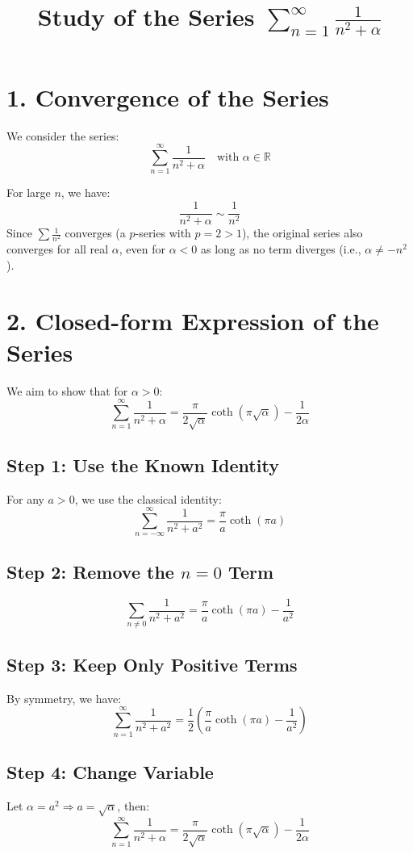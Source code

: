 \documentclass[a4paper,11pt]{article}
\title{Study of the Series \(\displaystyle \sum_{n=1}^{\infty} \frac{1}{n^2 + \alpha}\)}
\date{}
\begin{document}
\maketitle

\section*{1. Convergence of the Series}

We consider the series:
\[
\sum_{n=1}^{\infty} \frac{1}{n^2 + \alpha}
\quad \text{with } \alpha \in \mathbb{R}
\]

For large \( n \), we have:
\[
\frac{1}{n^2 + \alpha} \sim \frac{1}{n^2}
\]
Since \( \sum \frac{1}{n^2} \) converges (a \(p\)-series with \( p = 2 > 1 \)), the original series also converges for all real \( \alpha \), even for \( \alpha < 0 \) as long as no term diverges (i.e., \( \alpha \ne -n^2 \)).

\section*{2. Closed-form Expression of the Series}

We aim to show that for \( \alpha > 0 \):
\[
\sum_{n=1}^{\infty} \frac{1}{n^2 + \alpha}
= \frac{\pi}{2\sqrt{\alpha}} \coth(\pi \sqrt{\alpha}) - \frac{1}{2\alpha}
\]

\subsection*{Step 1: Use the Known Identity}
For any \( a > 0 \), we use the classical identity:
\[
\sum_{n=-\infty}^{\infty} \frac{1}{n^2 + a^2} = \frac{\pi}{a} \coth(\pi a)
\]

\subsection*{Step 2: Remove the \( n = 0 \) Term}
\[
\sum_{n \ne 0} \frac{1}{n^2 + a^2}
= \frac{\pi}{a} \coth(\pi a) - \frac{1}{a^2}
\]

\subsection*{Step 3: Keep Only Positive Terms}
By symmetry, we have:
\[
\sum_{n=1}^{\infty} \frac{1}{n^2 + a^2}
= \frac{1}{2} \left( \frac{\pi}{a} \coth(\pi a) - \frac{1}{a^2} \right)
\]

\subsection*{Step 4: Change Variable}
Let \( \alpha = a^2 \Rightarrow a = \sqrt{\alpha} \), then:
\[
\sum_{n=1}^{\infty} \frac{1}{n^2 + \alpha}
= \frac{\pi}{2\sqrt{\alpha}} \coth(\pi \sqrt{\alpha}) - \frac{1}{2\alpha}
\]
\end{document}
